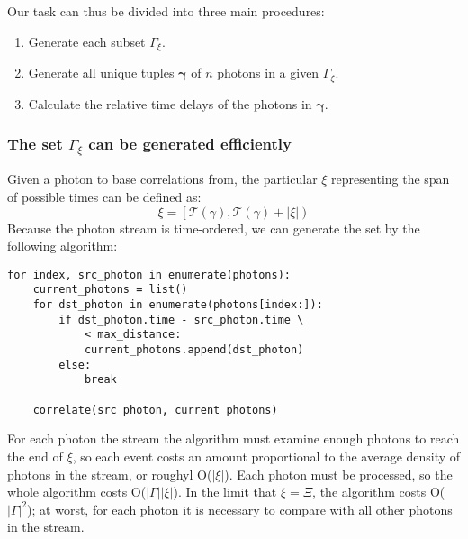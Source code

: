 \documentclass{article}
\newcommand{\braces}[1]{\ensuremath{\left\lbrace #1 \right\rbrace}}
\renewcommand{\vec}{\boldsymbol}
\newcommand{\abs}[1]{\ensuremath{\left|#1\right|}}
\newcommand{\Time}{\ensuremath{\mathcal{T}}}
\newcommand{\photon}{\ensuremath{\gamma}}
\newcommand{\photons}{\ensuremath{\Gamma}}
\newcommand{\integrationtime}{\ensuremath{\Xi}}
\newcommand{\timewindow}{\ensuremath{\xi}}
\begin{document}
Our task can thus be divided into three main procedures:
\begin{enumerate}
\item Generate each subset $\photons_{\timewindow}$.
\item Generate all unique tuples $\vec{\photon}$ of $n$ photons in a given $\photons_{\timewindow}$.
\item Calculate the relative time delays of the photons in $\vec{\photon}$.
\end{enumerate}

\subsubsection{The set $\photons_{\timewindow}$ can be generated efficiently}
Given a photon to base correlations from, the particular $\timewindow$ representing the span of possible times can be defined as:
\begin{equation}
\timewindow = \left[ \Time(\photon), \Time(\photon) + \abs{\timewindow} \right)
\end{equation}
Because the photon stream is time-ordered, we can generate the set by the following algorithm:
\begin{lstlisting}
for index, src_photon in enumerate(photons):
    current_photons = list()
    for dst_photon in enumerate(photons[index:]):
        if dst_photon.time - src_photon.time \ 
            < max_distance:
            current_photons.append(dst_photon)
        else:
            break

    correlate(src_photon, current_photons)
\end{lstlisting}
For each photon the stream the algorithm must examine enough photons to reach the end of $\timewindow$, so each event costs an amount proportional to the average density of photons in the stream, or roughyl O($\abs{\timewindow}$). Each photon must be processed, so the whole algorithm costs O($\abs{\photons}\abs{\timewindow}$). In the limit that $\timewindow=\integrationtime$, the algorithm costs O($\abs{\photons}^2$); at worst, for each photon it is necessary to compare with all other photons in the stream.
\end{document}
